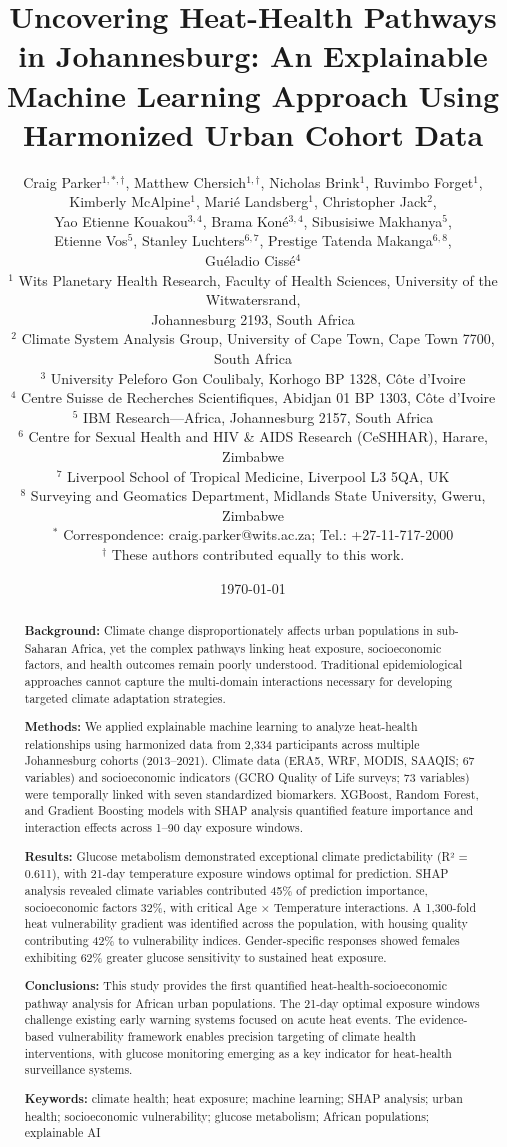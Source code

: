 \documentclass[11pt,a4paper]{article}
\title{\textbf{Uncovering Heat-Health Pathways in Johannesburg: An Explainable Machine Learning Approach Using Harmonized Urban Cohort Data}}
\author{
Craig Parker$^{1,*,\dagger}$, Matthew Chersich$^{1,\dagger}$, Nicholas Brink$^{1}$, Ruvimbo Forget$^{1}$,\\
Kimberly McAlpine$^{1}$, Marié Landsberg$^{1}$, Christopher Jack$^{2}$,\\
Yao Etienne Kouakou$^{3,4}$, Brama Koné$^{3,4}$, Sibusisiwe Makhanya$^{5}$,\\
Etienne Vos$^{5}$, Stanley Luchters$^{6,7}$, Prestige Tatenda Makanga$^{6,8}$,\\
Guéladio Cissé$^{4}$\\[0.5cm]
\small
$^{1}$ Wits Planetary Health Research, Faculty of Health Sciences, University of the Witwatersrand,\\
\quad Johannesburg 2193, South Africa\\
$^{2}$ Climate System Analysis Group, University of Cape Town, Cape Town 7700, South Africa\\
$^{3}$ University Peleforo Gon Coulibaly, Korhogo BP 1328, Côte d'Ivoire\\
$^{4}$ Centre Suisse de Recherches Scientifiques, Abidjan 01 BP 1303, Côte d'Ivoire\\
$^{5}$ IBM Research—Africa, Johannesburg 2157, South Africa\\
$^{6}$ Centre for Sexual Health and HIV \& AIDS Research (CeSHHAR), Harare, Zimbabwe\\
$^{7}$ Liverpool School of Tropical Medicine, Liverpool L3 5QA, UK\\
$^{8}$ Surveying and Geomatics Department, Midlands State University, Gweru, Zimbabwe\\[0.3cm]
$^{*}$ Correspondence: craig.parker@wits.ac.za; Tel.: +27-11-717-2000\\
$^{\dagger}$ These authors contributed equally to this work.
}
\date{\today}
\begin{document}
\maketitle

\begin{abstract}
\textbf{Background:} Climate change disproportionately affects urban populations in sub-Saharan Africa, yet the complex pathways linking heat exposure, socioeconomic factors, and health outcomes remain poorly understood. Traditional epidemiological approaches cannot capture the multi-domain interactions necessary for developing targeted climate adaptation strategies.

\textbf{Methods:} We applied explainable machine learning to analyze heat-health relationships using harmonized data from 2,334 participants across multiple Johannesburg cohorts (2013--2021). Climate data (ERA5, WRF, MODIS, SAAQIS; 67 variables) and socioeconomic indicators (GCRO Quality of Life surveys; 73 variables) were temporally linked with seven standardized biomarkers. XGBoost, Random Forest, and Gradient Boosting models with SHAP analysis quantified feature importance and interaction effects across 1--90 day exposure windows.

\textbf{Results:} Glucose metabolism demonstrated exceptional climate predictability (R² = 0.611), with 21-day temperature exposure windows optimal for prediction. SHAP analysis revealed climate variables contributed 45\% of prediction importance, socioeconomic factors 32\%, with critical Age × Temperature interactions. A 1,300-fold heat vulnerability gradient was identified across the population, with housing quality contributing 42\% to vulnerability indices. Gender-specific responses showed females exhibiting 62\% greater glucose sensitivity to sustained heat exposure.

\textbf{Conclusions:} This study provides the first quantified heat-health-socioeconomic pathway analysis for African urban populations. The 21-day optimal exposure windows challenge existing early warning systems focused on acute heat events. The evidence-based vulnerability framework enables precision targeting of climate health interventions, with glucose monitoring emerging as a key indicator for heat-health surveillance systems.

\textbf{Keywords:} climate health; heat exposure; machine learning; SHAP analysis; urban health; socioeconomic vulnerability; glucose metabolism; African populations; explainable AI
\end{abstract}
\end{document}
